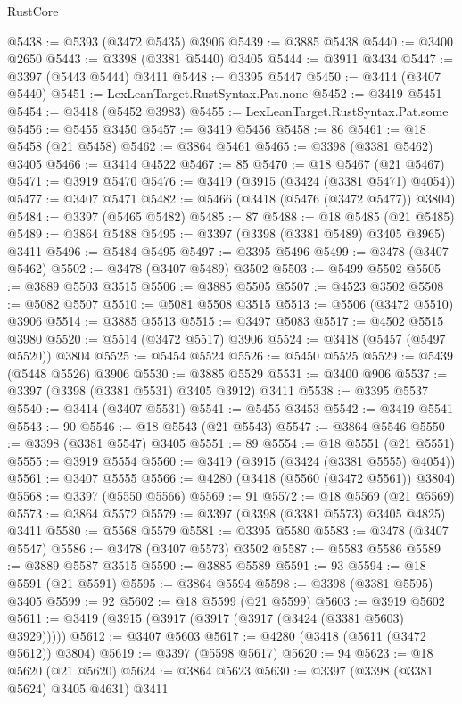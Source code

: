 \begin{lexlean}{RustCore}
\begin{coremodule}
@5438 := @5393 (@3472 @5435) @3906
@5439 := @3885 @5438
@5440 := @3400 @2650
@5443 := @3398 (@3381 @5440) @3405
@5444 := @3911 @3434
@5447 := @3397 (@5443 @5444) @3411
@5448 := @3395 @5447
@5450 := @3414 (@3407 @5440)
@5451 := LexLeanTarget.RustSyntax.Pat.none
@5452 := @3419 @5451
@5454 := @3418 (@5452 @3983)
@5455 := LexLeanTarget.RustSyntax.Pat.some
@5456 := @5455 @3450
@5457 := @3419 @5456
@5458 := 86
@5461 := @18 @5458 (@21 @5458)
@5462 := @3864 @5461
@5465 := @3398 (@3381 @5462) @3405
@5466 := @3414 @4522
@5467 := 85
@5470 := @18 @5467 (@21 @5467)
@5471 := @3919 @5470
@5476 := @3419 (@3915 (@3424 (@3381 @5471) @4054))
@5477 := @3407 @5471
@5482 := @5466 (@3418 (@5476 (@3472 @5477)) @3804)
@5484 := @3397 (@5465 @5482)
@5485 := 87
@5488 := @18 @5485 (@21 @5485)
@5489 := @3864 @5488
@5495 := @3397 (@3398 (@3381 @5489) @3405 @3965) @3411
@5496 := @5484 @5495
@5497 := @3395 @5496
@5499 := @3478 (@3407 @5462)
@5502 := @3478 (@3407 @5489) @3502
@5503 := @5499 @5502
@5505 := @3889 @5503 @3515
@5506 := @3885 @5505
@5507 := @4523 @3502
@5508 := @5082 @5507
@5510 := @5081 @5508 @3515
@5513 := @5506 (@3472 @5510) @3906
@5514 := @3885 @5513
@5515 := @3497 @5083
@5517 := @4502 @5515 @3980
@5520 := @5514 (@3472 @5517) @3906
@5524 := @3418 (@5457 (@5497 @5520)) @3804
@5525 := @5454 @5524
@5526 := @5450 @5525
@5529 := @5439 (@5448 @5526) @3906
@5530 := @3885 @5529
@5531 := @3400 @906
@5537 := @3397 (@3398 (@3381 @5531) @3405 @3912) @3411
@5538 := @3395 @5537
@5540 := @3414 (@3407 @5531)
@5541 := @5455 @3453
@5542 := @3419 @5541
@5543 := 90
@5546 := @18 @5543 (@21 @5543)
@5547 := @3864 @5546
@5550 := @3398 (@3381 @5547) @3405
@5551 := 89
@5554 := @18 @5551 (@21 @5551)
@5555 := @3919 @5554
@5560 := @3419 (@3915 (@3424 (@3381 @5555) @4054))
@5561 := @3407 @5555
@5566 := @4280 (@3418 (@5560 (@3472 @5561)) @3804)
@5568 := @3397 (@5550 @5566)
@5569 := 91
@5572 := @18 @5569 (@21 @5569)
@5573 := @3864 @5572
@5579 := @3397 (@3398 (@3381 @5573) @3405 @4825) @3411
@5580 := @5568 @5579
@5581 := @3395 @5580
@5583 := @3478 (@3407 @5547)
@5586 := @3478 (@3407 @5573) @3502
@5587 := @5583 @5586
@5589 := @3889 @5587 @3515
@5590 := @3885 @5589
@5591 := 93
@5594 := @18 @5591 (@21 @5591)
@5595 := @3864 @5594
@5598 := @3398 (@3381 @5595) @3405
@5599 := 92
@5602 := @18 @5599 (@21 @5599)
@5603 := @3919 @5602
@5611 := @3419 (@3915 (@3917 (@3917 (@3917 (@3424 (@3381 @5603) @3929)))))
@5612 := @3407 @5603
@5617 := @4280 (@3418 (@5611 (@3472 @5612)) @3804)
@5619 := @3397 (@5598 @5617)
@5620 := 94
@5623 := @18 @5620 (@21 @5620)
@5624 := @3864 @5623
@5630 := @3397 (@3398 (@3381 @5624) @3405 @4631) @3411

\end{coremodule}
\end{lexlean}
